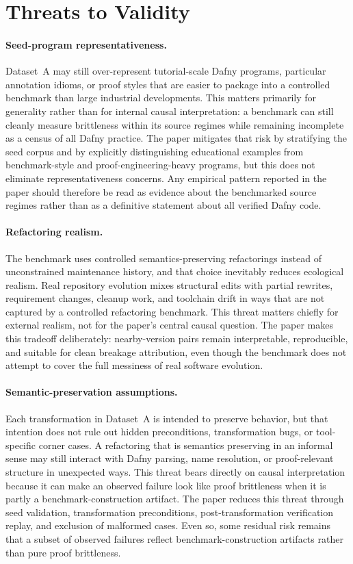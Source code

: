 \section{Threats to Validity}

\paragraph{Seed-program representativeness.}
Dataset~A may still over-represent tutorial-scale Dafny programs, particular annotation idioms, or proof styles that are easier to package into a controlled benchmark than large industrial developments. This matters primarily for generality rather than for internal causal interpretation: a benchmark can still cleanly measure brittleness within its source regimes while remaining incomplete as a census of all Dafny practice. The paper mitigates that risk by stratifying the seed corpus and by explicitly distinguishing educational examples from benchmark-style and proof-engineering-heavy programs, but this does not eliminate representativeness concerns. Any empirical pattern reported in the paper should therefore be read as evidence about the benchmarked source regimes rather than as a definitive statement about all verified Dafny code.

\paragraph{Refactoring realism.}
The benchmark uses controlled semantics-preserving refactorings instead of unconstrained maintenance history, and that choice inevitably reduces ecological realism. Real repository evolution mixes structural edits with partial rewrites, requirement changes, cleanup work, and toolchain drift in ways that are not captured by a controlled refactoring benchmark. This threat matters chiefly for external realism, not for the paper's central causal question. The paper makes this tradeoff deliberately: nearby-version pairs remain interpretable, reproducible, and suitable for clean breakage attribution, even though the benchmark does not attempt to cover the full messiness of real software evolution.

\paragraph{Semantic-preservation assumptions.}
Each transformation in Dataset~A is intended to preserve behavior, but that intention does not rule out hidden preconditions, transformation bugs, or tool-specific corner cases. A refactoring that is semantics preserving in an informal sense may still interact with Dafny parsing, name resolution, or proof-relevant structure in unexpected ways. This threat bears directly on causal interpretation because it can make an observed failure look like proof brittleness when it is partly a benchmark-construction artifact. The paper reduces this threat through seed validation, transformation preconditions, post-transformation verification replay, and exclusion of malformed cases. Even so, some residual risk remains that a subset of observed failures reflect benchmark-construction artifacts rather than pure proof brittleness.

